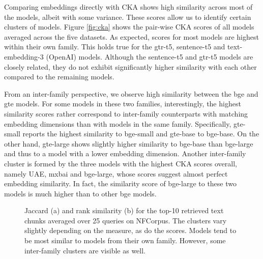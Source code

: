 \documentclass[nonacm,sigconf]{acmart}
\begin{document}
Comparing embeddings directly with CKA shows high similarity across most of the models, albeit with some variance. These scores allow us to identify certain clusters of models. Figure \ref{fig:cka} shows the pair-wise CKA scores of all models averaged across the five datasets. As expected, scores for most models are highest within their own family. This holds true for the gtr-t5, sentence-t5 and text-embedding-3 (OpenAI) models. Although the sentence-t5 and gtr-t5 models are closely related, they do not exhibit significantly higher similarity with each other compared to the remaining models.

From an inter-family perspective, we observe high similarity between the bge and gte models. For some models in these two families, interestingly, the highest similarity scores rather correspond to inter-family counterparts with matching embedding dimensions than with models in the same family. Specifically, gte-small reports the highest similarity to bge-small and gte-base to bge-base. On the other hand, gte-large shows slightly higher similarity to bge-base than bge-large and thus to a model with a lower embedding dimension. Another inter-family cluster is formed by the three models with the highest CKA scores overall, namely UAE, mxbai and bge-large, whose scores suggest almost perfect embedding similarity. In fact, the similarity score of bge-large to these two models is much higher than to other bge models.

\begin{figure*}
    \centering
    \caption{Jaccard (a) and rank similarity (b) for the top-10 retrieved text chunks averaged over 25 queries on NFCorpus. The clusters vary slightly depending on the measure, as do the scores. Models tend to be most similar to models from their own family. However, some inter-family clusters are visible as well.}
    \label{fig:nf_10}
\end{figure*}
\end{document}
